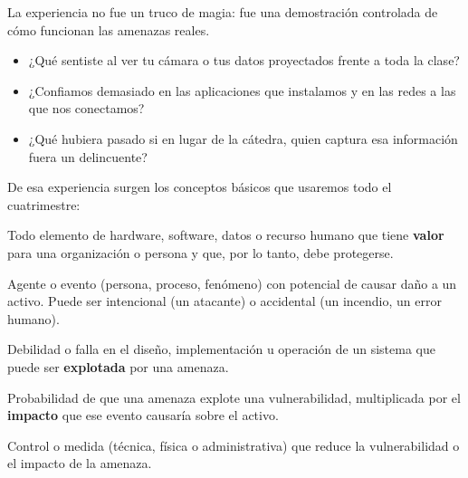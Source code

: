 \documentclass[11pt,a4paper]{article}
\begin{document}
La experiencia no fue un truco de magia: fue una demostración controlada de cómo funcionan las amenazas reales.

\begin{reflexion}
\begin{itemize}[leftmargin=*]
  \item ¿Qué sentiste al ver tu cámara o tus datos proyectados frente a toda la clase?
  \item ¿Confiamos demasiado en las aplicaciones que instalamos y en las redes a las que nos conectamos?
  \item ¿Qué hubiera pasado si en lugar de la cátedra, quien captura esa información fuera un delincuente?
\end{itemize}
\end{reflexion}

De esa experiencia surgen los conceptos básicos que usaremos todo el cuatrimestre:

\begin{definicion}[Activo]
Todo elemento de hardware, software, datos o recurso humano que tiene \textbf{valor} para una organización o persona y que, por lo tanto, debe protegerse.
\end{definicion}

\begin{definicion}[Amenaza]
Agente o evento (persona, proceso, fenómeno) con potencial de causar daño a un activo. Puede ser intencional (un atacante) o accidental (un incendio, un error humano).
\end{definicion}

\begin{definicion}[Vulnerabilidad]
Debilidad o falla en el diseño, implementación u operación de un sistema que puede ser \textbf{explotada} por una amenaza.
\end{definicion}

\begin{definicion}[Riesgo]
Probabilidad de que una amenaza explote una vulnerabilidad, multiplicada por el \textbf{impacto} que ese evento causaría sobre el activo.
\end{definicion}

\begin{definicion}
Control o medida (técnica, física o administrativa) que reduce la vulnerabilidad o el impacto de la amenaza.
\end{definicion}
\end{document}
